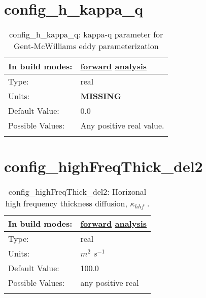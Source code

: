 \section[config\_h\_kappa\_q]{config\_h\_kappa\_q}
\label{sec:nm_sec_config_h_kappa_q}
\begin{center}
\begin{longtable}{| p{2.0in} || p{4.0in} |}
    \hline
    In build modes: & \hyperref[subsec:forward_nm_tab_standard_GM]{forward} \hyperref[subsec:analysis_nm_tab_standard_GM]{analysis} \\
    \hline
    Type: & real \\
    \hline
    Units: & {\bf \color{red} MISSING} \\
    \hline
    Default Value: & 0.0 \\
    \hline
    Possible Values: & Any positive real value. \\
    \hline
    \caption{config\_h\_kappa\_q: kappa-q parameter for Gent-McWilliams eddy parameterization}
\end{longtable}
\end{center}
\section[config\_highFreqThick\_del2]{config\_highFreqThick\_del2}
\label{sec:nm_sec_config_highFreqThick_del2}
\begin{center}
\begin{longtable}{| p{2.0in} || p{4.0in} |}
    \hline
    In build modes: & \hyperref[subsec:forward_nm_tab_ALE_frequency_filtered_thickness]{forward} \hyperref[subsec:analysis_nm_tab_ALE_frequency_filtered_thickness]{analysis} \\
    \hline
    Type: & real \\
    \hline
    Units: & $m^2$ $s^{-1}$ \\
    \hline
    Default Value: & 100.0 \\
    \hline
    Possible Values: & any positive real \\
    \hline
    \caption{config\_highFreqThick\_del2:  Horizonal high frequency thickness diffusion,  $\kappa_{hhf}$ .}
\end{longtable}
\end{center}
